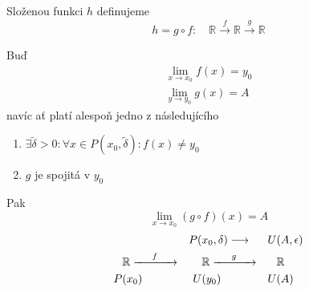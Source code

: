 \begin{definition}[name=Složená funkce, label=def:compoundFunction]
    Složenou funkci $h$ definujeme
    \begin{equation*}
         h = g\circ f:\quad \mathbb{R}\xrightarrow{f}\mathbb{R}\xrightarrow{g}\mathbb{R}
    \end{equation*}
\end{definition}

\begin{theorem}[name=Limita superpozice, label=thm:limitSuperposition]
    Buď
    \begin{align}
        \lim_{x\to x_0}f(x)=y_0 \\
        \lim_{y\to y_0}g(x)=A
    \end{align}
    navíc ať platí alespoň jedno z následujícího
    \begin{enumerate}
        \item $\exists\tilde{\delta}>0:\forall x\in P(x_0,\tilde{\delta}):f(x)\neq y_0$
            \label{thm:limitSuperposition:1}
        \item $g$ je spojitá v $y_0$ \label{thm:limitSuperposition:2}
    \end{enumerate}
    Pak
    \begin{equation}
        \lim_{x\to x_0}(g\circ f)(x)=A
    \end{equation}
    \begin{alignat}{3}
        &\quad &P(&x_0,\delta) \longrightarrow &U&(A,\epsilon) \nonumber\\
        &\mathbb{R}\mylongrightarrow{f}{5} &&\mathbb{R}\mylongrightarrow{g}{5} &&\mathbb{R} \\
        P&(x_0) &U&(y_0) &U&(A) \nonumber
    \end{alignat}
\end{theorem}
